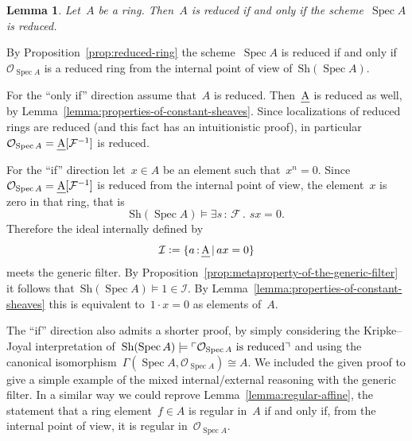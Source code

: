 \documentclass[10pt,reqno,a4paper]{amsbook}
\makeatletter
\theoremstyle{definition}
\theoremstyle{plain}
\newtheorem{lemma}[defn]{Lemma}
\theoremstyle{remark}
\newcommand{\F}{\mathcal{F}}
\renewcommand{\O}{\mathcal{O}}
\newcommand{\I}{\mathcal{I}}
\let\oldul\ul
\renewcommand{\ul}[1]{\text{\oldul{$#1$}}}
\newcommand{\Sh}{\mathrm{Sh}}
\DeclareMathOperator{\Spec}{Spec}
\newcommand{\?}{\,{:}\,}
\renewcommand{\_}{\mathpunct{.}\,}
\newcommand{\speak}[1]{\ulcorner\text{\textnormal{#1}}\urcorner}
\newcommand{\defeq}{\vcentcolon=}
\renewenvironment{proof}[1][\proofname]{\par
  \pushQED{\qed}%
  \normalfont \topsep6\p@\@plus6\p@\relax
  \trivlist
  \item[\hskip\labelsep
        \itshape
    #1\@addpunct{.}]\ignorespaces
}{%
  \popQED\endtrivlist\@endpefalse
}
\makeatother
\begin{document}
\begin{lemma}Let~$A$ be a ring. Then~$A$ is reduced if and only if the
scheme~$\Spec A$ is reduced.\end{lemma}
\begin{proof}By Proposition~\ref{prop:reduced-ring} the scheme~$\Spec A$ is
reduced if and only if~$\O_{\Spec A}$ is a reduced ring
from the internal point of view of~$\Sh(\Spec A)$.

For the ``only if'' direction assume that~$A$ is reduced. Then~$\ul{A}$ is
reduced as well, by Lemma~\ref{lemma:properties-of-constant-sheaves}. Since
localizations of reduced rings are reduced (and this fact has an intuitionistic
proof), in particular~$\O_{\Spec A} = \ul{A}[\F^{-1}]$ is reduced.

For the ``if'' direction let~$x \in A$ be an element such that~$x^n = 0$.
Since~$\O_{\Spec A} = \ul{A}[\F^{-1}]$ is reduced from the internal point of
view, the element~$x$ is zero in that ring, that is
\[ \Sh(\Spec A) \models \exists s\?\F\_ sx = 0. \]
Therefore the ideal internally defined by
\[ \I \defeq \{ a\?\ul{A} \,|\, ax = 0 \} \]
meets the generic filter. By
Proposition~\ref{prop:metaproperty-of-the-generic-filter} it follows
that~$\Sh(\Spec A) \models 1 \in \I$. By
Lemma~\ref{lemma:properties-of-constant-sheaves} this is equivalent to~$1 \cdot
x = 0$ as elements of~$A$.
\end{proof}

The ``if'' direction also admits a shorter proof, by simply
considering the Kripke--Joyal interpretation of~$\Sh(\Spec A) \models
\speak{$\O_{\Spec A}$ is reduced}$ and using the canonical isomorphism~$\Gamma(\Spec A, \O_{\Spec A})
\cong A$. We included the given proof to give a simple example of the mixed
internal/external reasoning with the generic filter. In a similar way we could
reprove Lemma~\ref{lemma:regular-affine}, the statement that a ring
element~$f \in A$ is regular in~$A$ if and only if, from the internal point of
view, it is regular in~$\O_{\Spec A}$.
\end{document}
